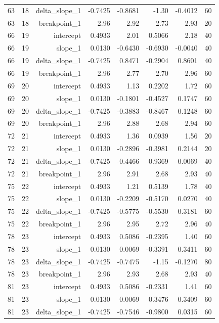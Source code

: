 {\begin{longtable}{lrrrrrrr}
  63 & 18 & delta\_slope\_1 & -0.7425 & -0.8681 & -1.30 & -0.4012 & 60 \\
  63 & 18 & breakpoint\_1 & 2.96 & 2.92 & 2.73 & 2.93 & 20 \\
  66 & 19 & intercept & 0.4933 & 2.01 & 0.5066 & 2.18 & 40 \\
  66 & 19 & slope\_1 & 0.0130 & -0.6430 & -0.6930 & -0.0040 & 40 \\
  66 & 19 & delta\_slope\_1 & -0.7425 & 0.8471 & -0.2904 & 0.8601 & 40 \\
  66 & 19 & breakpoint\_1 & 2.96 & 2.77 & 2.70 & 2.96 & 60 \\
  69 & 20 & intercept & 0.4933 & 1.13 & 0.2202 & 1.72 & 60 \\
  69 & 20 & slope\_1 & 0.0130 & -0.1801 & -0.4527 & 0.1747 & 60 \\
  69 & 20 & delta\_slope\_1 & -0.7425 & -0.3883 & -0.8467 & 0.1248 & 60 \\
  69 & 20 & breakpoint\_1 & 2.96 & 2.88 & 2.68 & 2.94 & 60 \\
  72 & 21 & intercept & 0.4933 & 1.36 & 0.0939 & 1.56 & 20 \\
  72 & 21 & slope\_1 & 0.0130 & -0.2896 & -0.3981 & 0.2144 & 20 \\
  72 & 21 & delta\_slope\_1 & -0.7425 & -0.4466 & -0.9369 & -0.0069 & 40 \\
  72 & 21 & breakpoint\_1 & 2.96 & 2.91 & 2.68 & 2.93 & 40 \\
  75 & 22 & intercept & 0.4933 & 1.21 & 0.5139 & 1.78 & 40 \\
  75 & 22 & slope\_1 & 0.0130 & -0.2209 & -0.5170 & 0.0270 & 40 \\
  75 & 22 & delta\_slope\_1 & -0.7425 & -0.5775 & -0.5530 & 0.3181 & 60 \\
  75 & 22 & breakpoint\_1 & 2.96 & 2.95 & 2.72 & 2.96 & 40 \\
  78 & 23 & intercept & 0.4933 & 0.5086 & -0.2395 & 1.40 & 60 \\
  78 & 23 & slope\_1 & 0.0130 & 0.0069 & -0.3391 & 0.3411 & 60 \\
  78 & 23 & delta\_slope\_1 & -0.7425 & -0.7475 & -1.15 & -0.1270 & 80 \\
  78 & 23 & breakpoint\_1 & 2.96 & 2.93 & 2.68 & 2.93 & 40 \\
  81 & 23 & intercept & 0.4933 & 0.5086 & -0.2331 & 1.41 & 60 \\
  81 & 23 & slope\_1 & 0.0130 & 0.0069 & -0.3476 & 0.3409 & 60 \\
  81 & 23 & delta\_slope\_1 & -0.7425 & -0.7546 & -0.9800 & 0.0315 & 60 \\

\end{longtable}}
